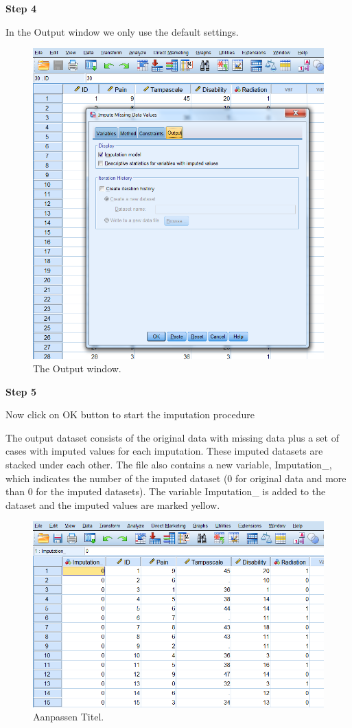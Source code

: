 \documentclass[]{book}
\theoremstyle{definition}
\theoremstyle{definition}
\theoremstyle{definition}
\theoremstyle{remark}
\begin{document}
\textbf{Step 4}

In the Output window we only use the default settings.

\begin{figure}

{\centering \includegraphics[width=0.7\linewidth]{images/fig3.21} 

}

\caption{The Output window.}\label{fig:fig3-21}
\end{figure}

\textbf{Step 5}

Now click on OK button to start the imputation procedure

The output dataset consists of the original data with missing data plus
a set of cases with imputed values for each imputation. These imputed
datasets are stacked under each other. The file also contains a new
variable, Imputation\_, which indicates the number of the imputed
dataset (0 for original data and more than 0 for the imputed datasets).
The variable Imputation\_ is added to the dataset and the imputed values
are marked yellow.

\begin{figure}

{\centering \includegraphics[width=0.7\linewidth]{images/fig3.22} 

}

\caption{Aanpassen Titel.}\label{fig:fig3-22}
\end{figure}
\end{document}
